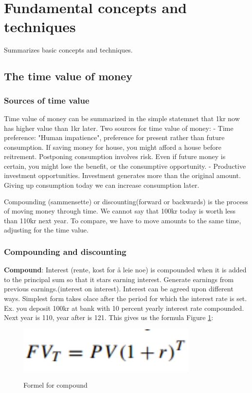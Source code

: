 \section{Fundamental concepts and techniques}
Summarizes basic concepts and techniques.

\subsection{The time value of money}
\subsubsection{Sources of time value}
Time value of money can be summarized in the simple statemnet that 1kr now has higher value than 1kr later. Two sources for time value of money:
- Time preference: "Human impatience", preference for present rather than future consumption. If saving money for house, you might afford a house before reitrement. Postponing consumption involves risk. Even if future money is certain, you might lose the benefit, or the consumptive opportunity.
- Productive investment opportunities. Investment generates more than the original amount. Giving up consumption today we can increase consumption later.

Compounding (sammensette) or discounting(forward or backwards) is the process of moving money through time. We cannot say that 100kr today is worth less than 110kr next year. To compare, we have to move amounts to the same time, adjusting for the time value.

\subsubsection{Compounding and discounting}
\textbf{Compound}: Interest (rente, kost for å leie noe) is compounded when it is added to the principal sum so that it stars earning interest. Generate earnings from previous earnings.(interest on interest).
Interest can be agreed upon different ways. Simplest form takes olace after the period for which the interest rate is set. Ex. you deposit 100kr at bank with 10 percent yearly interest rate compounded. Next year is 110, year after is 121. This gives us the formula Figure \ref{fig:formel1-2}:

\begin{figure}[ht!]
\centering
\includegraphics[width=90mm]{figures/formel1-2.png}
\label{fig:formel1-2}
\caption{Formel for compound}
\end{figure}

